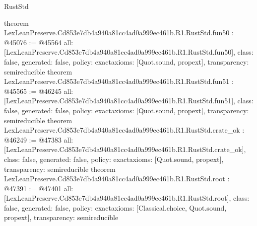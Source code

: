 \begin{lexlean}{RustStd}
\begin{coremodule}
{}
theorem LexLeanPreserve.Cd853e7db4a940a81cc4ad0a999ec461b.R1.RustStd.fun50 : @45076 := @45564 {
  all: [LexLeanPreserve.Cd853e7db4a940a81cc4ad0a999ec461b.R1.RustStd.fun50],
  class: false,
  generated: false,
  policy: exact{axioms: [Quot.sound, propext]},
  transparency: semireducible
}
theorem LexLeanPreserve.Cd853e7db4a940a81cc4ad0a999ec461b.R1.RustStd.fun51 : @45565 := @46245 {
  all: [LexLeanPreserve.Cd853e7db4a940a81cc4ad0a999ec461b.R1.RustStd.fun51],
  class: false,
  generated: false,
  policy: exact{axioms: [Quot.sound, propext]},
  transparency: semireducible
}
theorem LexLeanPreserve.Cd853e7db4a940a81cc4ad0a999ec461b.R1.RustStd.crate_ok : @46249 := @47383 {
  all: [LexLeanPreserve.Cd853e7db4a940a81cc4ad0a999ec461b.R1.RustStd.crate_ok],
  class: false,
  generated: false,
  policy: exact{axioms: [Quot.sound, propext]},
  transparency: semireducible
}
theorem LexLeanPreserve.Cd853e7db4a940a81cc4ad0a999ec461b.R1.RustStd.root : @47391 := @47401 {
  all: [LexLeanPreserve.Cd853e7db4a940a81cc4ad0a999ec461b.R1.RustStd.root],
  class: false,
  generated: false,
  policy: exact{axioms: [Classical.choice, Quot.sound, propext]},
  transparency: semireducible
}


\end{coremodule}
\end{lexlean}
